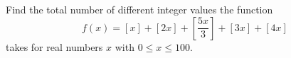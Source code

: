 Find the total number of different integer values the function \[ f(x) = [x] + [2x] + [\frac{5x}{3}] + [3x] + [4x] \] takes for real numbers $x$ with $0 \leq x \leq 100$.